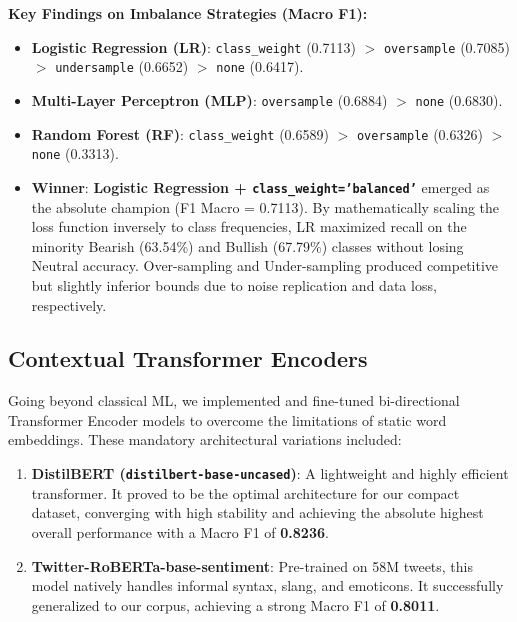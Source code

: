 \documentclass[11pt,a4paper]{article}
\begin{document}
\noindent \textbf{Key Findings on Imbalance Strategies (Macro F1):}
\begin{itemize}[noitemsep]
    \item \textbf{Logistic Regression (LR)}: \texttt{class\_weight} (0.7113) $>$ \texttt{oversample} (0.7085) $>$ \texttt{undersample} (0.6652) $>$ \texttt{none} (0.6417).
    \item \textbf{Multi-Layer Perceptron (MLP)}: \texttt{oversample} (0.6884) $>$ \texttt{none} (0.6830).
    \item \textbf{Random Forest (RF)}: \texttt{class\_weight} (0.6589) $>$ \texttt{oversample} (0.6326) $>$ \texttt{none} (0.3313).
    \item \textbf{Winner}: \textbf{Logistic Regression + \texttt{class\_weight='balanced'}} emerged as the absolute champion (F1 Macro = 0.7113). By mathematically scaling the loss function inversely to class frequencies, LR maximized recall on the minority Bearish (63.54\%) and Bullish (67.79\%) classes without losing Neutral accuracy. Over-sampling and Under-sampling produced competitive but slightly inferior bounds due to noise replication and data loss, respectively.
\end{itemize}

\subsection{Contextual Transformer Encoders}
Going beyond classical ML, we implemented and fine-tuned bi-directional Transformer Encoder models to overcome the limitations of static word embeddings. These mandatory architectural variations included:
\begin{enumerate}[noitemsep]
    \item \textbf{DistilBERT (\texttt{distilbert-base-uncased})}: A lightweight and highly efficient transformer. It proved to be the optimal architecture for our compact dataset, converging with high stability and achieving the absolute highest overall performance with a Macro F1 of \textbf{0.8236}.
    \item \textbf{Twitter-RoBERTa-base-sentiment}: Pre-trained on 58M tweets, this model natively handles informal syntax, slang, and emoticons. It successfully generalized to our corpus, achieving a strong Macro F1 of \textbf{0.8011}.
\end{enumerate}
\end{document}
